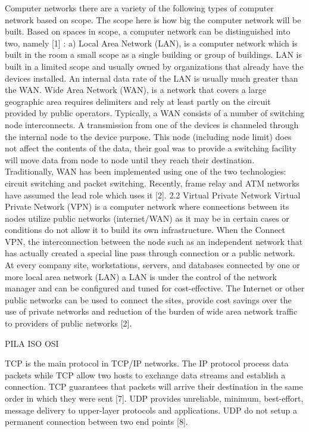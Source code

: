 Computer networks there are a variety of the following types of computer network based on scope. The scope here is how big the computer network will be built. Based on spaces in scope, a computer network can be distinguished into two, namely [1] : a) Local Area Network (LAN), is a computer network which is built in the room a small scope as a single building or group of buildings. LAN is built in a limited scope and usually owned by organizations that already have the devices installed. An internal data rate of the LAN is usually much greater than the WAN. Wide Area Network (WAN), is a network that covers a large geographic area requires delimiters and rely at least partly on the circuit provided by public operators. Typically, a WAN consists of a number of switching node interconnects. A transmission from one of the devices is channeled through the internal node to the device purpose. This node (including node limit) does not affect the contents of the data, their goal was to
provide a switching facility will move data from node to node until they reach their destination. Traditionally, WAN has been implemented using one of the two technologies: circuit switching and packet switching. Recently, frame relay and ATM networks have assumed the lead role which uses it [2].
2.2 Virtual Private Network
Virtual Private Network (VPN) is a computer network where connections between its nodes utilize public networks (internet/WAN) as it may be in certain cases or conditions do not allow it to build its own infrastructure. When the Connect VPN, the interconnection between the node such as an independent network that has actually created a special line pass through connection or a public network. At every company site, workstations, servers, and databases connected by one or more local area network (LAN) a LAN is under the control of the network manager and can be configured and tuned for cost-effective. The Internet or other public networks can be used to connect the sites, provide cost savings over the use of private networks and reduction of the burden of wide area network traffic to providers of public networks [2].

PILA ISO OSI

TCP is the main protocol in TCP/IP networks. The IP protocol process data packets while TCP allow two hosts to exchange data streams and establish a connection. TCP guarantees that packets will arrive their destination in the same order in which they were sent [7].
UDP provides unreliable, minimum, best-effort, message delivery to upper-layer protocols and applications. UDP do not setup a permanent connection between two end points [8].

